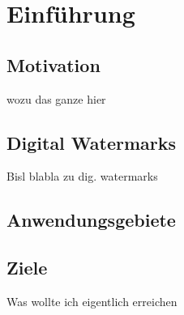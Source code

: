 \chapter{Einf\"uhrung}
\label{ch:intro}

\section{Motivation}

wozu das ganze hier

\section{Digital Watermarks}

Bisl blabla zu dig. watermarks

\section{Anwendungsgebiete}

\section{Ziele}

Was wollte ich eigentlich erreichen